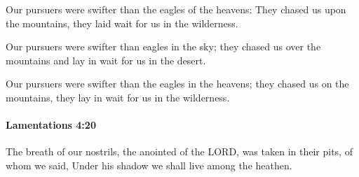 			\begin{versebox}
					\item[BHS] 
					\item[LXX] 
					\item[ASV] Our pursuers were swifter than the eagles of the heavens: They chased us upon the mountains, they laid wait for us in the wilderness.
					\item[NIV] Our pursuers were swifter than eagles in the sky; they chased us over the mountains and lay in wait for us in the desert.
					\item[NRSV] Our pursuers were swifter than the eagles in the heavens; they chased us on the mountains, they lay in wait for us in the wilderness.
			\end{versebox}

		\paragraph{Lamentations 4:20} %
			\label{LAMENTATIONS-4-20}

			The breath of our nostrils, the anointed of the LORD, was taken in their pits, of whom we said, Under his shadow we shall live among the heathen.

